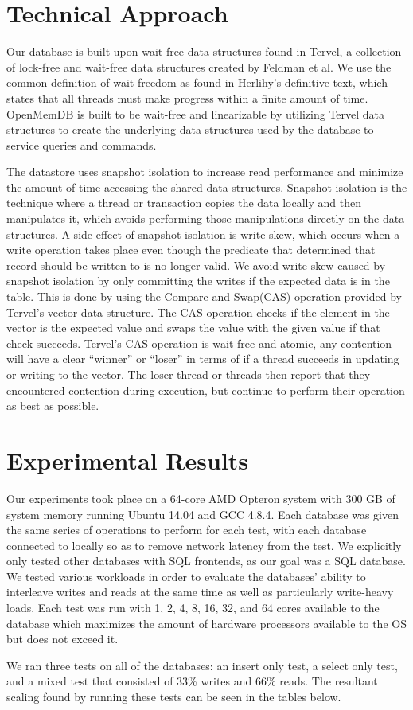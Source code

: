 \documentclass[conference, compsoc]{IEEEtran}
\begin{document}
\section{Technical Approach}
Our database is built upon wait-free data structures found in Tervel, a collection of
lock-free and wait-free data structures created by Feldman et al\cite{tervel:hazard_pointer}\cite{tervel:hash_map}\cite{tervel:vector}. 
We use the common definition of wait-freedom as found in Herlihy's definitive text, which
states that all threads must make progress within a finite amount of time\cite{herlihy:waitfree}. OpenMemDB is 
built to be wait-free and linearizable by utilizing Tervel data structures to create the 
underlying data structures used by the database to service queries and commands.

The datastore uses snapshot isolation to increase read performance and minimize the amount of time accessing
the shared data structures. Snapshot isolation is the technique where a thread or transaction copies the data
locally and then manipulates it, which avoids performing those manipulations directly on the data structures.
A side effect of snapshot isolation is write skew, which occurs when a write operation takes place even though the
predicate that determined that record should be written to is no longer valid.
We avoid write skew caused by snapshot isolation by only committing the writes
if the expected data is in the table. This is done by using the Compare and Swap(CAS) operation provided
by Tervel's vector data structure. The CAS operation checks if the element in the vector is the
expected value and swaps the value with the given value if that check succeeds. Tervel's CAS
operation is wait-free and atomic, any contention will have a clear ``winner'' or ``loser'' in terms
of if a thread succeeds in updating or writing to the vector. The loser thread or threads then report
that they encountered contention during execution, but continue to perform their operation as best as 
possible.

\section{Experimental Results}
Our experiments took place on a 64-core AMD Opteron system with 300 GB of system memory running Ubuntu 14.04 and 
GCC 4.8.4. Each database was given the same series of operations to perform for each test, with each database 
connected to locally so as to remove network latency from the test. We explicitly only tested other databases
with SQL frontends, as our goal was a SQL database. We tested various workloads in order to evaluate 
the databases' ability to interleave writes and reads at the same time as well as particularly write-heavy 
loads. Each test was run with 1, 2, 4, 8, 16, 32, and 64 cores available to the database which maximizes the amount of hardware processors
available to the OS but does not exceed it. 
\par\vspace{\baselineskip}
We ran three tests on all of the databases: an insert only test, a select only test, and
a mixed test that consisted of 33\% writes and 66\% reads.
The resultant scaling found by running these tests can be seen in the tables below. 
\end{document}
